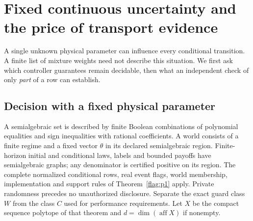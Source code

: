 \section{Fixed continuous uncertainty and the price of transport evidence}\label{app:probability}
A single unknown physical parameter can influence every conditional transition. A finite list of mixture weights need not describe this situation. We first ask which controller guarantees remain decidable, then what an independent check of only \emph{part} of a row can establish.

\subsection{Decision with a fixed physical parameter}
A semialgebraic set is described by finite Boolean combinations of polynomial equalities and sign inequalities with rational coefficients. A world consists of a finite regime and a fixed vector \(\theta\) in its declared semialgebraic region. Finite-horizon initial and conditional laws, labels and bounded payoffs have semialgebraic graphs; any denominator is certified positive on its region. The complete normalized conditional rows, real event flags, world membership, implementation and support rules of Theorem~\ref{flag:p1} apply. Private randomness precedes no unauthorized disclosure. Separate the exact guard class \(W\) from the class \(C\) used for performance requirements. Let \(X\) be the compact sequence polytope of that theorem and \(d=\dim(\operatorname{aff}X)\) if nonempty.

